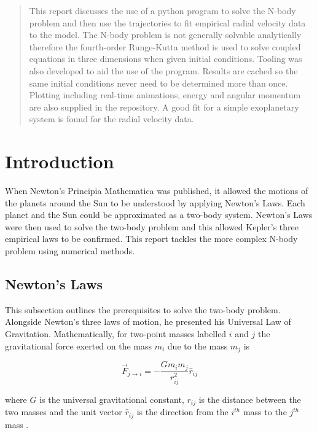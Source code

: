 \documentclass{physics_article_B}
\date{\today}
\begin{document}
\maketitle

\begin{abstract}
This report discusses the use of a python program to solve the N-body problem and then use the trajectories to fit empirical radial velocity data to the model. The N-body problem is not generally solvable analytically therefore the fourth-order Runge-Kutta method is used to solve coupled equations in three dimensions when given initial conditions. Tooling was also developed to aid the use of the program. Results are cached so the same initial conditions never need to be determined more than once. Plotting including real-time animations, energy and angular momentum are also supplied in the repository. A good fit for a simple exoplanetary system is found for the radial velocity data.
\end{abstract}

\section{Introduction}

When Newton's Principia Mathematica was published, it allowed the motions of the planets around the Sun to be understood by applying Newton's Laws. Each planet and the Sun could be approximated as a two-body system. Newton's Laws were then used to solve the two-body problem and this allowed Kepler's three empirical laws to be confirmed. This report tackles the more complex N-body problem using numerical methods.

\subsection{Newton's Laws}
This subsection outlines the prerequisites to solve the two-body problem. Alongside Newton's three laws of motion, he presented his Universal Law of Gravitation. Mathematically, for two-point masses labelled $i$ and $j$ the gravitational force exerted on the mass $m_i$ due to the mass $m_j$ is

\begin{equation}
\vec{F}_{j\rightarrow i} = -\frac{Gm_im_j}{r_{ij}^2}\hat{r}_{ij}
\label{eq:gravitationforce}
\end{equation}

where $G$ is the universal gravitational constant, $r_{ij}$ is the distance between the two masses and the unit vector $\hat{r}_{ij}$ is the direction from the $i^{th}$ mass to the $j^{th}$ mass \cite{hartle_gravity_2003}.
\end{document}
